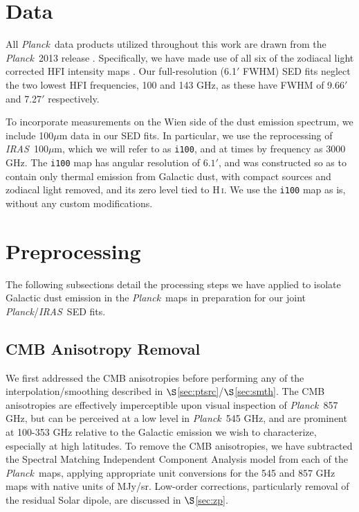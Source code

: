 \documentclass{emulateapj}
\newcommand{\IRAS}{{\it IRAS}}
\newcommand{\PLANCK}{{\it Planck}}
\begin{document}
\section{Data}
\label{sec:data}
All \PLANCK~data products utilized throughout this work are drawn from the 
\PLANCK~2013 release \citep{planck2013}. Specifically, we have made use 
of all six of the zodiacal light corrected HFI intensity maps
\citep[\texttt{R1.10\_nominal\_ZodiCorrected},][]{planckzodi}. Our 
full-resolution (6.1$'$ FWHM) SED fits neglect the two lowest HFI frequencies, 
100 and 143 GHz, as these have FWHM of 9.66$'$ and 7.27$'$ respectively.

To incorporate measurements on the Wien side of the dust emission spectrum, 
we include 100$\mu$m data in our SED fits. In particular, we use the 
\citet[henceforth SFD]{SFD} reprocessing of \IRAS~100$\mu$m, which we will 
refer to as \verb|i100|, and at times by frequency as 3000 GHz. The \verb|i100|
 map has angular resolution of $6.1'$, and was constructed so as to contain 
only thermal emission from Galactic dust, with compact sources and zodiacal 
light removed, and its zero level tied to H\,\textsc{i}. We use the \verb|i100|
map as is, without any custom modifications.

\section{Preprocessing}
\label{sec:prepro}

The following subsections detail the processing steps we have applied to 
isolate Galactic dust emission in the \PLANCK~maps in preparation for our joint
\PLANCK/\IRAS~SED fits. %

\subsection{CMB Anisotropy Removal}
\label{sec:cmb}
We first addressed the CMB anisotropies before performing any of the 
interpolation/smoothing described in $\S$\ref{sec:ptsrc}/$\S$\ref{sec:smth}. 
The CMB anisotropies are effectively imperceptible upon visual inspection 
of \PLANCK~857 GHz, but can be perceived at a low level in \PLANCK~545 GHz, and
are prominent at 100-353 GHz relative to the Galactic emission
we wish to characterize, especially at high latitudes. To remove the CMB 
anisotropies, we have subtracted the Spectral Matching Independent Component 
Analysis \citep[SMICA,][]{smica} model from each of the \PLANCK~maps, 
applying appropriate unit conversions for the 545 and 857 GHz maps with native 
units of MJy/sr. Low-order corrections, particularly removal of the residual 
Solar dipole, are discussed in $\S$\ref{sec:zp}.
\end{document}
